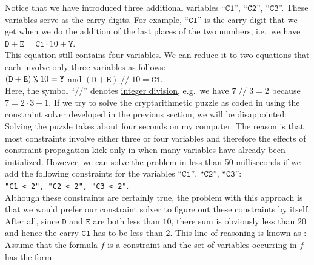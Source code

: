 Notice that we have introduced three additional variables ``$\texttt{C1}$'', ``$\texttt{C2}$'', ``$\texttt{C3}$''. 
These variables serve as the \href{https://en.wikipedia.org/wiki/Carry_(arithmetic)}{carry digits}.  For
example, ``$\texttt{C1}$'' is the carry digit that we get when we do the addition of the last places of the two
numbers, i.e.~we have
\\[0.2cm]
\hspace*{1.3cm}
$\texttt{D} + \texttt{E} = \texttt{C1} \cdot 10 + \texttt{Y}$.
\\[0.2cm]
This equation still contains four variables.  We can reduce it to two equations that each involve only three
variables as follows:
\\[0.2cm]
\hspace*{1.3cm}
$(\texttt{D} + \texttt{E})\; \texttt{\symbol{37}}\; 10 = \texttt{Y}$ \quad and \quad
$(\texttt{D} + \texttt{E}) \;\texttt{//}\; 10 = \texttt{C1}$.
\\[0.2cm]
Here, the symbol ``$\texttt{//}$'' denotes 
\href{https://en.wikipedia.org/wiki/Division_(mathematics)#Of_integers}{integer division}, 
e.g.~we have $7 \;\texttt{//}\; 3 = 2$ because $7 = 2 \cdot 3 + 1$.
If we try to solve the cryptarithmetic puzzle as coded in  using the
constraint solver developed in the previous section, we will be disappointed: Solving the puzzle takes about
four seconds on my computer.  The reason is that most constraints involve either three or four variables and
therefore the effects of constraint propagation kick only in when many variables have already been initialized.
However, we can solve the problem in less than 50 milliseconds if we add the following constraints for the 
variables ``$\texttt{C1}$'', ``$\texttt{C2}$'', ``$\texttt{C3}$'':
\\[0.2cm]
\hspace*{1.3cm}
\texttt{"C1 < 2", "C2 < 2", "C3 < 2"}.
\\[0.2cm]
Although these constraints are certainly true, the problem with this approach is that we would prefer our
constraint solver to figure out these constraints by itself.  After all, since $\texttt{D}$ and
$\texttt{E}$ are both less than $10$, there sum is obviously less than $20$ and hence the carry $\texttt{C1}$
has to be less than $2$.  This line of reasoning is known as :
Assume that the formula $f$ is a constraint and the set of variables occurring in $f$ has the form
\\[0.2cm]
\hspace*{1.3cm}
